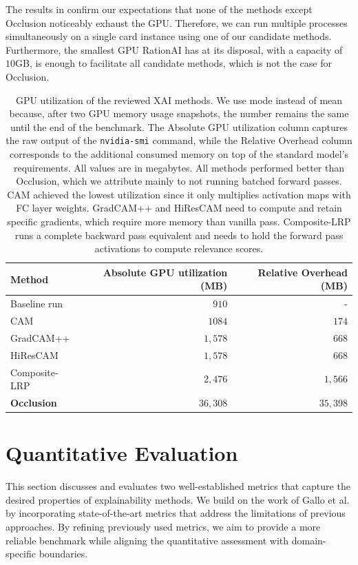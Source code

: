 The results in  confirm our expectations that none of the methods except Occlusion noticeably exhaust the GPU.
Therefore, we can run multiple processes simultaneously on a single card instance using one of our candidate methods.
Furthermore, the smallest GPU RationAI has at its disposal, with a capacity of $10$GB, is enough to facilitate all candidate methods, which is not the case for Occlusion.
\begin{table}
\centering
{}
\begin{tabular}{@{} l r r @{}}\toprule
Method & Absolute GPU utilization (MB) & Relative Overhead (MB) \\ 
\midrule
Baseline run       & $910$      & -       \\
CAM                & $1084$     & $174$   \\
GradCAM++          & $1,578$     & $668$   \\
HiResCAM           & $1,578$     & $668$   \\
Composite-LRP      & $2,476$     & $1,566$  \\
\textbf{Occlusion} & $36,308$    & $35,398$ \\
\bottomrule
\end{tabular}
\caption{
GPU utilization of the reviewed XAI methods.
We use mode instead of mean because, after two GPU memory usage snapshots, the number remains the same until the end of the benchmark.
The Absolute GPU utilization column captures the raw output of the \texttt{nvidia-smi} command, while the Relative Overhead column corresponds to the additional consumed memory on top of the standard model's requirements.
All values are in megabytes.
All methods performed better than Occlusion, which we attribute mainly to not running batched forward passes.
CAM achieved the lowest utilization since it only multiplies activation maps with FC layer weights.
GradCAM++ and HiResCAM need to compute and retain specific gradients, which require more memory than vanilla pass.
Composite-LRP runs a complete backward pass equivalent and needs to hold the forward pass activations to compute relevance scores.
}
\label{tab:gpu-util}
\end{table}


\section{Quantitative Evaluation}\label{sec:quant}

This section discusses and evaluates two well-established metrics that capture the desired properties of explainability methods.
We build on the work of Gallo et al. \cite{gallo} by incorporating state-of-the-art metrics that address the limitations of previous approaches.
By refining previously used metrics, we aim to provide a more reliable benchmark while aligning the quantitative assessment with domain-specific boundaries.

